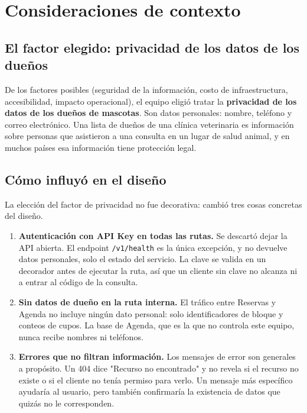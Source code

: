 \documentclass[12pt, a4paper]{article}
\begin{document}
\newpage
\section{Consideraciones de contexto}\label{sec:contexto}

\subsection{El factor elegido: privacidad de los datos de los dueños}

De los factores posibles (seguridad de la información, costo de
infraestructura, accesibilidad, impacto operacional), el equipo eligió
tratar la \textbf{privacidad de los datos de los dueños de mascotas}. Son
datos personales: nombre, teléfono y correo electrónico. Una lista de dueños 
de una clínica veterinaria es información sobre personas que asistieron
a una consulta en un lugar de salud animal, y en muchos países esa
información tiene protección legal.

\subsection{Cómo influyó en el diseño}

La elección del factor de privacidad no fue decorativa: cambió tres cosas
concretas del diseño.

\begin{enumerate}[leftmargin=1.7cm]
    \item \textbf{Autenticación con API Key en todas las rutas.} Se
    descartó dejar la API abierta. El endpoint \texttt{/v1/health} es la
    única excepción, y no devuelve datos personales, solo el estado del
    servicio. La clave se valida en un decorador antes de ejecutar la
    ruta, así que un cliente sin clave no alcanza ni a entrar al código de
    la consulta.
    \item \textbf{Sin datos de dueño en la ruta interna.} El tráfico entre
    Reservas y Agenda no incluye ningún dato personal: solo identificadores
    de bloque y conteos de cupos. La base de Agenda, que es la que no
    controla este equipo, nunca recibe nombres ni teléfonos.
    \item \textbf{Errores que no filtran información.} Los mensajes de
    error son generales a propósito. Un 404 dice "Recurso no encontrado" y
    no revela si el recurso no existe o si el cliente no tenía permiso
    para verlo. Un mensaje más específico ayudaría al usuario, pero
    también confirmaría la existencia de datos que quizás no le
    corresponden.
\end{enumerate}
\end{document}
